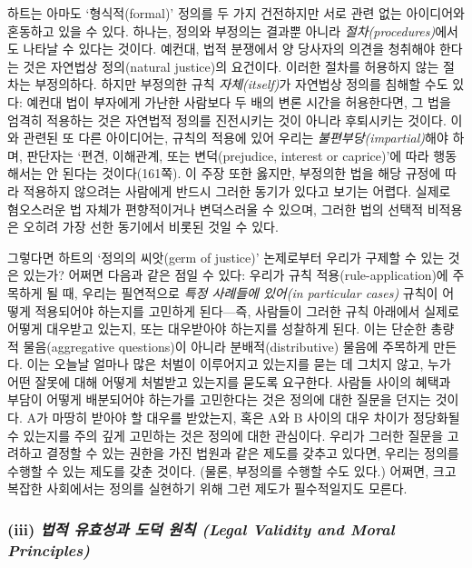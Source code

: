 \documentclass[12pt, oneside]{book}  %
\begin{document}
하트는 아마도 `형식적(formal)' 정의를 두 가지 건전하지만 서로 관련 없는
아이디어와 혼동하고 있을 수 있다. 하나는, 정의와 부정의는 결과뿐 아니라
\emph{절차(procedures)}에서도 나타날 수 있다는 것이다. 예컨대, 법적
분쟁에서 양 당사자의 의견을 청취해야 한다는 것은 자연법상 정의(natural
justice)의 요건이다. 이러한 절차를 허용하지 않는 절차는 부정의하다.
하지만 부정의한 규칙 \emph{자체(itself)}가 자연법상 정의를 침해할 수도
있다: 예컨대 법이 부자에게 가난한 사람보다 두 배의 변론 시간을
허용한다면, 그 법을 엄격히 적용하는 것은 자연법적 정의를 진전시키는 것이
아니라 후퇴시키는 것이다. 이와 관련된 또 다른 아이디어는, 규칙의 적용에
있어 우리는 \emph{불편부당(impartial)}해야 하며, 판단자는 `편견,
이해관계, 또는 변덕(prejudice, interest or caprice)'에 따라 행동해서는
안 된다는 것이다(161쪽). 이 주장 또한 옳지만, 부정의한 법을 해당 규정에
따라 적용하지 않으려는 사람에게 반드시 그러한 동기가 있다고 보기는
어렵다. 실제로 혐오스러운 법 자체가 편향적이거나 변덕스러울 수 있으며,
그러한 법의 선택적 비적용은 오히려 가장 선한 동기에서 비롯된 것일 수
있다.

그렇다면 하트의 `정의의 씨앗(germ of justice)' 논제로부터 우리가 구제할
수 있는 것은 있는가? 어쩌면 다음과 같은 점일 수 있다: 우리가 규칙
적용(rule-application)에 주목하게 될 때, 우리는 필연적으로 \emph{특정
사례들에 있어(in particular cases)} 규칙이 어떻게 적용되어야 하는지를
고민하게 된다---즉, 사람들이 그러한 규칙 아래에서 실제로 어떻게 대우받고
있는지, 또는 대우받아야 하는지를 성찰하게 된다. 이는 단순한 총량적
물음(aggregative questions)이 아니라 분배적(distributive) 물음에
주목하게 만든다. 이는 오늘날 얼마나 많은 처벌이 이루어지고 있는지를 묻는
데 그치지 않고, 누가 어떤 잘못에 대해 어떻게 처벌받고 있는지를 묻도록
요구한다. 사람들 사이의 혜택과 부담이 어떻게 배분되어야 하는가를
고민한다는 것은 정의에 대한 질문을 던지는 것이다. A가 마땅히 받아야 할
대우를 받았는지, 혹은 A와 B 사이의 대우 차이가 정당화될 수 있는지를 주의
깊게 고민하는 것은 정의에 대한 관심이다. 우리가 그러한 질문을 고려하고
결정할 수 있는 권한을 가진 법원과 같은 제도를 갖추고 있다면, 우리는
정의를 수행할 수 있는 제도를 갖춘 것이다. (물론, 부정의를 수행할 수도
있다.) 어쩌면, 크고 복잡한 사회에서는 정의를 실현하기 위해 그런 제도가
필수적일지도 모른다.

\subsubsection{\texorpdfstring{(iii) \emph{법적 유효성과 도덕 원칙
(Legal Validity and Moral
Principles)}}{(iii) 법적 유효성과 도덕 원칙 (Legal Validity and Moral Principles)}}\label{iii-uxbc95uxc801-uxc720uxd6a8uxc131uxacfc-uxb3c4uxb355-uxc6d0uxce59-legal-validity-and-moral-principles}
\end{document}
